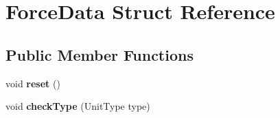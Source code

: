 \hypertarget{struct_force_data}{\section{Force\-Data Struct Reference}
\label{struct_force_data}
}
\subsection*{Public Member Functions}
\begin{DoxyCompactItemize}
\item 
\hypertarget{struct_force_data_af4c23f58a0f56c180d3f97c7c0298fb8}{void {\bfseries reset} ()}\label{struct_force_data_af4c23f58a0f56c180d3f97c7c0298fb8}

\item 
\hypertarget{struct_force_data_a36146c02bae451662b90680164a6ebf5}{void {\bfseries check\-Type} (Unit\-Type type)}\label{struct_force_data_a36146c02bae451662b90680164a6ebf5}

\end{DoxyCompactItemize}

